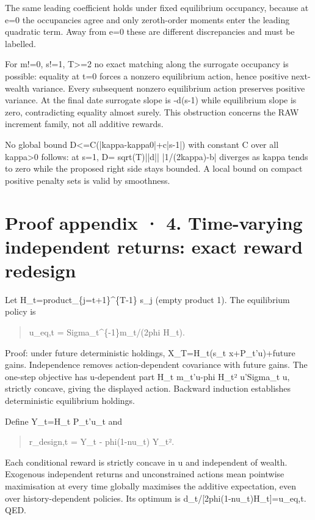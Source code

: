 \documentclass[10pt,a4paper]{article}
\begin{document}
The same leading coefficient holds under fixed equilibrium occupancy, because at e=0 the occupancies agree and only zeroth-order moments enter the leading quadratic term. Away from e=0 these are different discrepancies and must be labelled.

For m!=0, s!=1, T>=2 no exact matching along the surrogate occupancy is possible: equality at t=0 forces a nonzero equilibrium action, hence positive next-wealth variance. Every subsequent nonzero equilibrium action preserves positive variance. At the final date surrogate slope is -d(s-1) while equilibrium slope is zero, contradicting equality almost surely. This obstruction concerns the RAW increment family, not all additive rewards.

No global bound D<=C(|kappa-kappa0|+c|s-1|) with constant C over all kappa>0 follows: at s=1, D= sqrt(T)||d|| |1/(2kappa)-b| diverges as kappa tends to zero while the proposed right side stays bounded. A local bound on compact positive penalty sets is valid by smoothness.

\clearpage
\section*{Proof appendix · 4. Time-varying independent returns: exact reward redesign}
Let H\_t=product\_\{j=t+1\}\textasciicircum{}\{T-1\} s\_j (empty product 1). The equilibrium policy is

\begin{quote}\small
u\_eq,t = Sigma\_t\textasciicircum{}\{-1\}m\_t/(2phi H\_t).
\end{quote}
Proof: under future deterministic holdings, X\_T=H\_t(s\_t x+P\_t'u)+future gains. Independence removes action-dependent covariance with future gains. The one-step objective has u-dependent part H\_t m\_t'u-phi H\_t² u'Sigma\_t u, strictly concave, giving the displayed action. Backward induction establishes deterministic equilibrium holdings.

Define Y\_t=H\_t P\_t'u\_t and

\begin{quote}\small
r\_design,t = Y\_t - phi(1-nu\_t) Y\_t².
\end{quote}
Each conditional reward is strictly concave in u and independent of wealth. Exogenous independent returns and unconstrained actions mean pointwise maximisation at every time globally maximises the additive expectation, even over history-dependent policies. Its optimum is d\_t/[2phi(1-nu\_t)H\_t]=u\_eq,t. QED.
\end{document}
